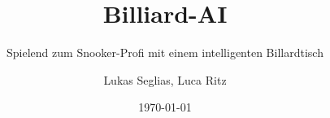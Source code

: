 \documentclass[
    10pt, %
    a4paper, %
    twoside, %
    openright, %
    numbers=noenddot, %
    BCOR=5mm, %
    parskip=half*, %
    thesis, %
]{bfhbook}
\author{Lukas Seglias, Luca Ritz}
\title{Billiard-AI}
\subtitle{Spielend zum Snooker-Profi mit einem intelligenten Billardtisch}
\date{\today} %
\begin{document}
    \maketitle
    \frontmatter %
    \allowdisplaybreaks

    \tableofcontents
    \sloppy
    \mainmatter %
   
   
   
   
   
   
   

    \listoffigures
    \listoftables
    \printbibliography

    
    
    

    
\end{document}
